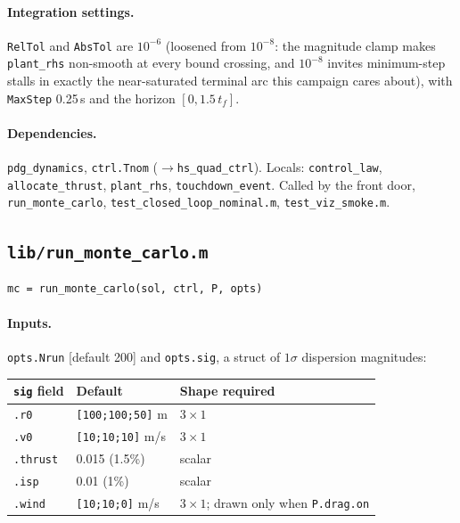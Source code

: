 \documentclass[11pt]{article}
\newcommand{\file}[1]{\texttt{#1}}
\begin{document}
\paragraph{Integration settings.} \texttt{RelTol} and \texttt{AbsTol} are
$10^{-6}$ (loosened from $10^{-8}$: the magnitude clamp makes
\texttt{plant\_rhs} non-smooth at every bound crossing, and $10^{-8}$
invites minimum-step stalls in exactly the near-saturated terminal arc this
campaign cares about), with \texttt{MaxStep} 0.25\,s and the horizon
$[0, 1.5\,t_f]$.

\paragraph{Dependencies.} \texttt{pdg\_dynamics}, \texttt{ctrl.Tnom}
($\to$\texttt{hs\_quad\_ctrl}). Locals: \texttt{control\_law},
\texttt{allocate\_thrust}, \texttt{plant\_rhs}, \texttt{touchdown\_event}.
Called by the front door, \texttt{run\_monte\_carlo},
\file{test\_closed\_loop\_nominal.m}, \file{test\_viz\_smoke.m}.

\subsection{\texttt{lib/run\_monte\_carlo.m}}
\label{sec:mod:mc}

\begin{verbatim}
mc = run_monte_carlo(sol, ctrl, P, opts)
\end{verbatim}

\paragraph{Inputs.} \texttt{opts.Nrun} [default 200] and
\texttt{opts.sig}, a struct of $1\sigma$ dispersion magnitudes:

\begin{center}
\begin{tabular}{@{}lll@{}}
\toprule
\texttt{sig} field & Default & Shape required \\
\midrule
\texttt{.r0}     & \texttt{[100;100;50]} m & $3\times1$ \\
\texttt{.v0}     & \texttt{[10;10;10]} m/s & $3\times1$ \\
\texttt{.thrust} & 0.015 (1.5\%) & scalar \\
\texttt{.isp}    & 0.01 (1\%) & scalar \\
\texttt{.wind}   & \texttt{[10;10;0]} m/s & $3\times1$; drawn only when
  \texttt{P.drag.on} \\
\bottomrule
\end{tabular}
\end{center}
\end{document}
